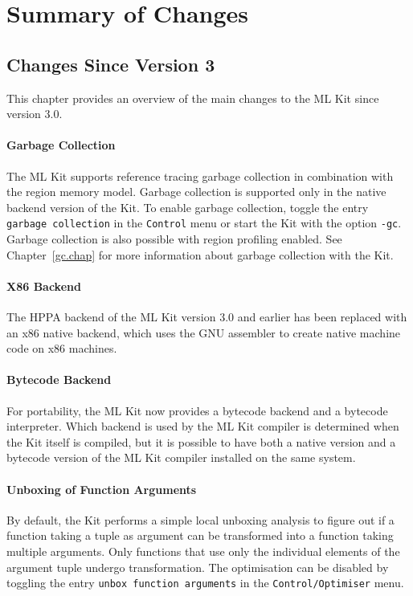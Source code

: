 \documentclass[12pt]{book}
\begin{document}
\chapter{Summary of Changes}

\section{Changes Since Version 3}
%
This chapter provides an overview of the main changes to the ML Kit
since version 3.0.

\subsubsection*{Garbage Collection}
%
The ML Kit supports reference tracing garbage collection in
combination with the region memory model. Garbage collection is
supported only in the native backend version of the Kit. To enable
garbage collection, toggle the entry {\tt garbage collection} in the
{\tt Control} menu or start the Kit with the option {\tt -gc}. Garbage
collection is also possible with region profiling enabled. See
Chapter~\ref{gc.chap} for more information about garbage collection
with the Kit.

\subsubsection*{X86 Backend}
The 
%
HPPA backend of the ML Kit version 3.0 and earlier has been replaced
with an
%
x86 native backend, which uses the GNU assembler to create native
machine code on x86 machines.

\subsubsection*{Bytecode Backend}
%
For portability, the ML Kit now provides a bytecode backend and a
bytecode interpreter. Which backend is used by the ML Kit compiler is
determined when the Kit itself is compiled, but it is possible to have
both a native version and a bytecode version of the ML Kit compiler
installed on the same system.

\subsubsection*{Unboxing of Function Arguments}
%
%
%
By default, the Kit performs a simple local unboxing analysis to
figure out if a function taking a tuple as argument can be transformed
into a function taking multiple arguments. Only functions that use
only the individual elements of the argument tuple undergo
transformation. The optimisation can be disabled by toggling the entry
{\tt unbox function arguments} in the {\tt Control/Optimiser} menu.
\end{document}
